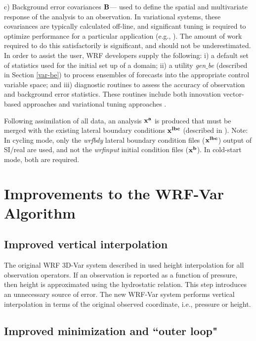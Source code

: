 \vspace{0.5cm}

c) Background error covariances ${\bf B}$--- used to define the spatial
and multivariate response of the analysis to an observation. In
variational systems, these covariances are typically calculated
off-line, and significant tuning is required to optimize performance
for a particular application (e.g., \citet{ingleby01, wu02}). The
amount of work required to do this satisfactorily is significant, and
should not be underestimated. In order to assist the user, WRF
developers supply the following: i) a default set of statistics used
for the initial set up of a domain; ii) a utility {\it gen$\_$be}
(described in Section
\ref{var-be}) to process ensembles of forecasts into the appropriate control variable 
space; and iii) diagnostic routines to assess the accuracy of
observation and background error statistics. These routines include
both innovation vector-based approaches \citep{hollingsworth86} and
variational tuning approaches \citep{desroziers01}.

Following assimilation of all data, an analysis ${\bf x^{a}}$ is produced that must be 
merged with the existing lateral boundary conditions ${\bf x^{lbc}}$ (described in 
\citet{barker03}). Note: In cycling mode, only the {\it wrfbdy} lateral boundary condition 
files (${\bf x^{lbc}}$) output of SI/real are used, and not the {\it wrfinput} initial condition 
files (${\bf x^{b}}$). In cold-start mode, both are required.

\section{Improvements to the WRF-Var Algorithm}
\label{var-upgrade}

\subsection{Improved vertical interpolation}

The original WRF 3D-Var system described in \citet{barker04} used height 
interpolation for all observation operators. If an observation is reported as a 
function of pressure, then height is approximated using the 
hydrostatic relation. This step introduces an unnecessary source of error. 
The new WRF-Var system performs vertical interpolation in terms of the 
original observed coordinate, i.e., pressure or height.

\subsection{Improved minimization and ``outer loop"}

